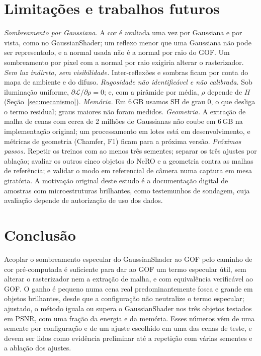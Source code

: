 \documentclass[12pt]{article}
\begin{document}
\section{Limitações e trabalhos futuros}
\label{sec:limitacoes}
\emph{Sombreamento por Gaussiana.} A cor é avaliada uma vez por Gaussiana e por vista, como no GaussianShader; um reflexo menor que uma Gaussiana não pode ser representado, e a normal usada não é a normal por raio do GOF.
Um sombreamento por pixel com a normal por raio exigiria alterar o rasterizador.
\emph{Sem luz indireta, sem visibilidade.} Inter-reflexões e sombras ficam por conta do mapa de ambiente e do difuso.
\emph{Rugosidade não identificável e não calibrada.} Sob iluminação uniforme, $\partial\mathcal{L}/\partial\rho=0$; e, com a pirâmide por média, $\rho$ depende de $H$ (Seção~\ref{sec:mecanismo}).
\emph{Memória.} Em 6\,GB usamos SH de grau 0, o que desliga o termo residual; graus maiores não foram medidos.
\emph{Geometria.} A extração de malha de cenas com cerca de 2 milhões de Gaussianas não coube em 6\,GB na implementação original; um processamento em lotes está em desenvolvimento, e métricas de geometria (Chamfer, F1) ficam para a próxima versão.
\emph{Próximos passos.} Repetir os treinos com ao menos três sementes; separar os três ajustes por ablação; avaliar os outros cinco objetos do NeRO e a geometria contra as malhas de referência; e validar o modo em referencial de câmera numa captura em mesa giratória.
A motivação original deste estudo é a documentação digital de amostras com microestruturas brilhantes, como testemunhos de sondagem, cuja avaliação depende de autorização de uso dos dados.

\section{Conclusão}
Acoplar o sombreamento especular do GaussianShader ao GOF pelo caminho de cor pré-computada é suficiente para dar ao GOF um termo especular útil, sem alterar o rasterizador nem a extração de malha, e com equivalência verificável ao GOF.
O ganho é pequeno numa cena real predominantemente fosca e grande em objetos brilhantes, desde que a configuração não neutralize o termo especular; ajustado, o método iguala ou supera o GaussianShader nos três objetos testados em PSNR, com uma fração da energia e da memória.
Esses números vêm de uma semente por configuração e de um ajuste escolhido em uma das cenas de teste, e devem ser lidos como evidência preliminar até a repetição com várias sementes e a ablação dos ajustes.
\end{document}
